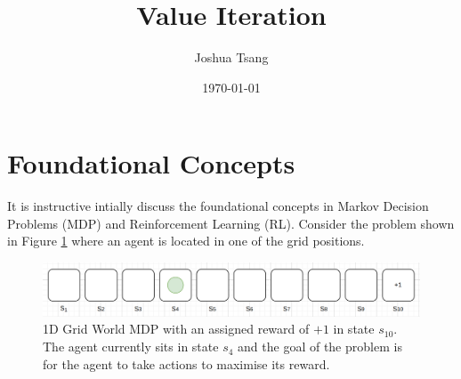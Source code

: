 \documentclass[a4paper,11pt]{article}
\title{Value Iteration}
\author{Joshua Tsang}
\date{\today}
\begin{document}
\maketitle
\tableofcontents

\section{Foundational Concepts}

It is instructive intially discuss the foundational concepts in Markov Decision Problems (MDP) and Reinforcement Learning (RL).  Consider the problem shown in Figure \ref{fig:1d-grid-world-problem-statement} where an agent is located in one of the grid positions.

\begin{figure}
    \includegraphics[width=\textwidth]{images/1d-grid-world-problem-statement.png}
    \caption{1D Grid World MDP with an assigned reward of $+1$ in state $s_{10}$.  The agent currently sits in state $s_4$ and the goal of the problem is for the agent to take actions to maximise its reward.}
    \label{fig:1d-grid-world-problem-statement}
\end{figure}
\end{document}
